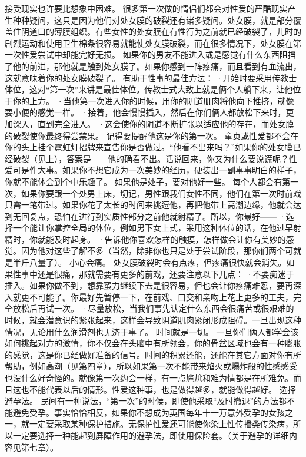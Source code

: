 \documentclass[12pt,UTF8,openany]{ctexbook}
\begin{document}
接受现实也许要比想象中困难。
很多第一次做的情侣们都会对性爱的严酷现实产生种种疑问，这只是因为他们对处女膜的破裂还有诸多疑问。处女膜，就是部分覆盖住阴道口的薄膜组织。有些女性的处女膜在有性行为之前就已经破裂了，儿时的剧烈运动和使用卫生棉条很容易就能使处女膜破裂，而在很多情况下，处女膜在第一次性爱尝试中却能完好无损。
如果你的男友不能进入或是感觉有什么东西阻挡了他的前进，那他就是触到处女膜了。如果你感到一阵疼痛，而且看到有血流出，这就意味着你的处女膜破裂了。
有助于性事的最佳方法：
·开始时要采用传教士体位，这对“第一次”来讲是最佳体位。传教士式大致上就是俩个人躺下来，让他位于你的上方。
·当他第一次进入你的时候，用你的阴道肌肉将他向下推挤，就像要小便的感觉一样。
·接着，他会慢慢插入，然后在你们俩人都放松下来时，更加深入，直到完全进入。
·这会使你的阴道不断扩张以适应他的存在，而处女膜的破裂使你最终得尝禁果。
记得要提醒他这是你的第一次。
童贞或性爱都不会在你的头上挂个霓虹灯招牌来宣告你是否做过。“他看不出来吗？”如果你的处女膜已经破裂（见上），答案是——他的确看不出。话说回来，你又为什么要说谎呢？性爱可是件大事。如果你不想它成为一次美妙的经历，硬装出一副事事明白的样子，你就不能体会到个中乐趣了。
如果他是处子，要对他好一些。
每个人都会有第一次，如果你要跟一个处男上床，切记，男性跟我们女性不同，他们在第一次时前戏只需一笔带过。如果你花了太长的时间来挑逗他，再把他带上高潮边缘，他就会达到无回复点，恐怕在进行到实质性部分之前他就射精了。所以，你最好——
·选择一个能让你掌控全局的体位，例如男下女上式，采用这种体位的话，在他过早射精时，你就能及时起身。
·告诉他你喜欢怎样的触摸，怎样做会让你有美妙的感觉。因为他对这些了解不多（当然，除非你也只是处于尝试阶段，那你们两个可就是半斤八量了）。
小心会痛。
处女膜破裂时会有点疼，但疼痛很快就会消失。如果性事中还是很痛，那就需要有更多的前戏，还要注意以下几点：
·不要痴迷于插入。如果你做不到，想靠蛮力继续下去是很容易，但也会让你疼痛难忍，要再深入就更不可能了。你最好先暂停一下，在前戏、口交和亲吻上花上更多的工夫，完全放松后再试一次。
·尽量放松，当我们事先认定什么东西会很痛苦或很艰难的时候，就会潜意识的紧张起来，这样会导致阴道肌肉紧闭形成阻碍。一旦出现这种情况，无论用什么润滑剂也无济于事了。
时间就是一切。
一旦你们俩人都学会该如何挑起对方的激情，你不仅会在头脑中有所领会，你的骨盆区域也会有一种膨胀的感觉，这是你已经做好准备的信号。时间的积累还能，还能在其它方面对你有所帮助，例如高潮（见第四章），所以如果第一次不能带来焰火或爆炸般的性感感受也没什么好奇怪的。就像第一次约会一样，有一点尴尬和难为情都是在所难免。而且这也不能代表以后的情形。性爱这种事，也是做得越多，就能做得越好。
选择避孕法。
民间有一种说法，“第一次”的时候，即使他采取“及时撤退”的方法都不能避免受孕。事实恰恰相反，如果你不想成为英国每年十一万意外受孕的女孩之一，就一定要采取某种保护措施。无保护性爱还可能使你染上性传播类传染病，所以一定要选择一种能起到屏障作用的避孕法，即使用保险套。（关于避孕的详细内容见第七章）。
\end{document}
